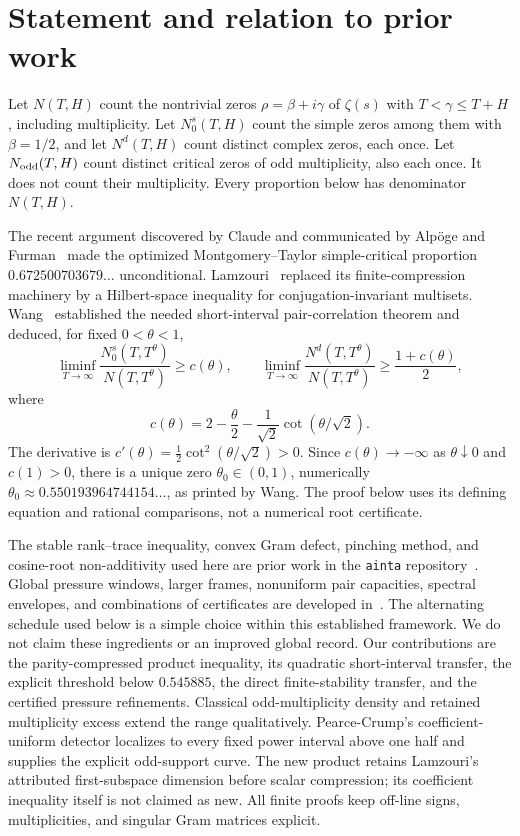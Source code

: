 ﻿\documentclass[11pt]{article}
\theoremstyle{remark}
\begin{document}
\section{Statement and relation to prior work}

Let $N(T,H)$ count the nontrivial zeros $\rho=\beta+i\gamma$ of $\zeta(s)$
with $T<\gamma\le T+H$, including multiplicity. Let $N_0^s(T,H)$ count the
simple zeros among them with $\beta=1/2$, and let $N^d(T,H)$ count distinct
complex zeros, each once. Let $N_{\rm odd}(T,H)$ count distinct critical
zeros of odd multiplicity, also each once. It does not count their
multiplicity. Every proportion below has denominator $N(T,H)$.

The recent argument discovered by Claude and communicated by Alp\"oge and %
Furman~\cite{AF} made the optimized Montgomery--Taylor simple-critical
proportion $0.672500703679\ldots$ unconditional. Lamzouri~\cite{Lamzouri}
replaced its finite-compression machinery by a Hilbert-space inequality for
conjugation-invariant multisets. Wang~\cite{Wang} established the needed
short-interval pair-correlation theorem and deduced, for fixed $0<\theta<1$,
\begin{equation}\label{eq:wang}
 \liminf_{T\to\infty}\frac{N_0^s(T,T^\theta)}{N(T,T^\theta)}\ge c(\theta),
 \qquad
 \liminf_{T\to\infty}\frac{N^d(T,T^\theta)}{N(T,T^\theta)}
 \ge\frac{1+c(\theta)}2,
\end{equation}
where
\begin{equation}\label{eq:c}
 c(\theta)=2-\frac\theta2-\frac1{\sqrt2}\cot(\theta/\sqrt2).
\end{equation}
The derivative is $c'(\theta)=\tfrac12\cot^2(\theta/\sqrt2)>0$. Since
$c(\theta)\to-\infty$ as $\theta\downarrow0$ and $c(1)>0$, there is a
unique zero $\theta_0\in(0,1)$, numerically
$\theta_0\approx0.550193964744154\ldots$, as printed by Wang. The
proof below uses its defining equation and rational comparisons, not a
numerical root certificate.

The stable rank--trace inequality, convex Gram defect, pinching method, and
cosine-root non-additivity used here are prior work in the
\texttt{ainta} repository~\cite{Ainta}. Global pressure windows, larger
frames, nonuniform pair capacities, spectral envelopes, and combinations
of certificates are developed in~\cite{Trmdy,Tawan,Shi}. The alternating
schedule used below is a simple choice within this established framework.
We do not claim these ingredients or an improved global record. Our
contributions are the parity-compressed product inequality, its quadratic
short-interval transfer, the explicit threshold below $0.545885$, the direct
finite-stability transfer, and the certified pressure refinements. Classical
odd-multiplicity density and retained multiplicity excess extend the range
qualitatively. Pearce-Crump's coefficient-uniform detector localizes to every
fixed power interval above one half and supplies the explicit odd-support
curve. The new product retains Lamzouri's attributed first-subspace dimension
before scalar compression; its coefficient inequality itself is not claimed
as new. All finite proofs keep off-line signs, multiplicities, and singular
Gram matrices explicit.
\end{document}
